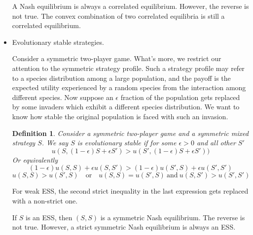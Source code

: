 \documentclass{article}
\newtheorem{definition}{Definition}
\begin{document}
\begin{itemize}
A Nash equilibrium is always a correlated equilibrium. However, the reverse is not true. The convex combination of two correlated equilibria is still a correlated equilibrium.

\item Evolutionary stable strategies.

Consider a symmetric two-player game. What's more, we restrict our attention to the symmetric strategy profile. Such a strategy profile may refer to a species distribution among a large population, and the payoff is the expected utility experienced by a random species from the interaction among different species. Now suppose an $\epsilon$ fraction of the population gets replaced by some invaders which exhibit a different species distribution. We want to know how stable the original population is faced with such an invasion.

\begin{definition}
Consider a symmetric two-player game and a symmetric mixed strategy $S$. We say $S$ is evolutionary stable if for some $\epsilon>0$ and all other $S'$
$$u(S,(1-\epsilon)S+\epsilon S')>u(S',(1-\epsilon)S+\epsilon S'))$$
Or equivalently
$$(1-\epsilon)u(S,S)+\epsilon u(S,S')>(1-\epsilon)u(S',S)+\epsilon u(S',S')$$
$$u(S,S)>u(S',S)\quad\mathrm{or}\quad u(S,S)=u(S',S)\ \mathrm{and}\ u(S,S')>u(S',S')$$
\end{definition}

For weak ESS, the second strict inequality in the last expression gets replaced with a non-strict one.

If $S$ is an ESS, then $(S,S)$ is a symmetric Nash equilibrium. The reverse is not true. However, a strict symmetric Nash equilibrium is always an ESS.

\end{itemize}
\end{document}

